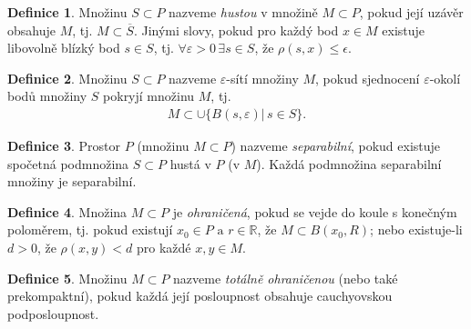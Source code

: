 \documentclass[a4]{report}
\theoremstyle{definition}
\newtheorem{definition}{Definice}[section]
\begin{document}
{\begin{definition}
Množinu $S\subset P$ nazveme \textit{hustou} v množině $M\subset P$, pokud její uzávěr obsahuje $M$, tj.
$M \subset\overline{S}$. Jinými slovy, pokud pro každý bod $x\in M$ existuje libovolně blízký bod $s\in S$, tj. $\forall \varepsilon>0 \, \exists s\in S$, že $\rho(s,x)\leq\epsilon$.
\end{definition}
\begin{definition}
Množinu $S\subset P$ nazveme $\varepsilon$-sítí množiny $M$, pokud sjednocení $\varepsilon$-okolí bodů množiny $S$ pokryjí množinu $M$, tj. 
\begin{align*}
M\subset \cup \{B(s,\varepsilon)|\,s\in S\}.
\end{align*}
\end{definition}
\begin{definition}
Prostor $P$ (množinu $M\subset P$) nazveme \textit{separabilní}, pokud existuje spočetná podmnožina $S\subset P$ hustá v $P$ (v $M$). Každá podmnožina separabilní množiny je separabilní.
\end{definition}
\begin{definition}
Množina $M\subset P$ je \textit{ohraničená}, pokud se vejde do koule s konečným poloměrem, tj.
pokud existují $x_0\in P \text{ a } r\in \mathbb{R}$, že $M\subset B(x_0, R)$; nebo existuje-li $d > 0$, že $\rho(x, y) < d$ pro každé $x, y\in M$.
\end{definition}
\begin{definition}
Množinu $M\subset P$ nazveme \textit{totálně ohraničenou} (nebo také prekompaktní), pokud
každá její posloupnost obsahuje cauchyovskou podposloupnost.
\end{definition}
}
\end{document}
